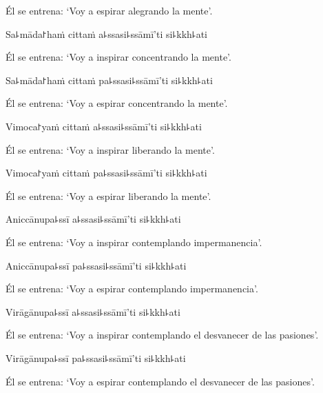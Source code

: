 \begin{english}
  Él se entrena: `Voy a espirar alegrando la mente'.
\end{english}

Sa꜕māda꜓haṁ cittaṁ a꜕ssasi꜕ssāmī'ti si꜕kkh꜕ati

\begin{english}
  Él se entrena: `Voy a inspirar concentrando la mente'.
\end{english}

Sa꜕māda꜓haṁ cittaṁ pa꜕ssasi꜕ssāmī'ti si꜕kkh꜕ati

\begin{english}
  Él se entrena: `Voy a espirar concentrando la mente'.
\end{english}

Vimoca꜓yaṁ cittaṁ a꜕ssasi꜕ssāmī'ti si꜕kkh꜕ati

\begin{english}
  Él se entrena: `Voy a inspirar liberando la mente'.
\end{english}

Vimoca꜓yaṁ cittaṁ pa꜕ssasi꜕ssāmī'ti si꜕kkh꜕ati

\begin{english}
  Él se entrena: `Voy a espirar liberando la mente'.
\end{english}

Aniccānupa꜕ssī a꜕ssasi꜕ssāmī'ti si꜕kkh꜕ati

\begin{english}
  Él se entrena: `Voy a inspirar contemplando impermanencia'.
\end{english}

Aniccānupa꜕ssī pa꜕ssasi꜕ssāmī'ti si꜕kkh꜕ati

\begin{english}
  Él se entrena: `Voy a espirar contemplando impermanencia'.
\end{english}

Virāgānupa꜕ssī a꜕ssasi꜕ssāmī'ti si꜕kkh꜕ati

\begin{english}
  Él se entrena: `Voy a inspirar contemplando el desvanecer de las pasiones'.
\end{english}

Virāgānupa꜕ssī pa꜕ssasi꜕ssāmī'ti si꜕kkh꜕ati

\begin{english}
  Él se entrena: `Voy a espirar contemplando el desvanecer de las pasiones'.
\end{english}


